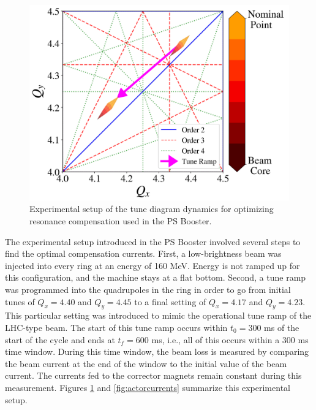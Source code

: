 \begin{figure}[H]
    \centering
    \includegraphics[width=\linewidth]{chapter5/experiment.png}
    \caption{Experimental setup of the tune diagram dynamics for optimizing resonance compensation used in the PS Booster.}
    \label{fig:experimentPSB}
\end{figure}

The experimental setup introduced in the PS Booster involved several steps to find the optimal compensation currents. First, a low-brightness beam was injected into every ring at an energy of 160 MeV. Energy is not ramped up for this configuration, and the machine stays at a flat bottom. Second, a tune ramp was programmed into the quadrupoles in the ring in order to go from initial tunes of $Q_x = 4.40$ and $Q_y = 4.45$ to a final setting of $Q_x = 4.17$ and $Q_y = 4.23$. This particular setting was introduced to mimic the operational tune ramp of the LHC-type beam. The start of this tune ramp occurs within $t_0 = 300$ ms of the start of the cycle and ends at $t_f = 600$ ms, i.e., all of this occurs within a 300 ms time window. During this time window, the beam loss is measured by comparing the beam current at the end of the window to the initial value of the beam current. The currents fed to the corrector magnets remain constant during this measurement. Figures \ref{fig:experimentPSB} and \ref{fig:actorcurrents} summarize this experimental setup. 

